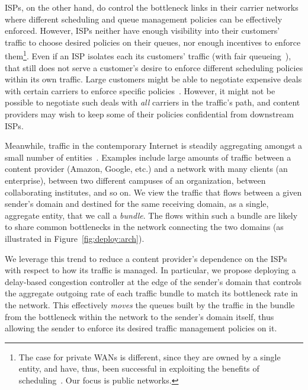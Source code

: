 ISPs, on the other hand, do control the bottleneck links in their carrier networks where different scheduling and queue management policies can be effectively enforced. 
However, ISPs neither have enough visibility into their customers' traffic to choose desired policies on their queues, nor enough incentives to enforce them\footnote{The case for private WANs is different, since they are owned by a single entity, and have, thus, been successful in exploiting the benefits of scheduling~\cite{swan, b4, bwe}. Our focus is public networks.}. Even if an ISP isolates each its customers' traffic (\eg with fair queueing~\cite{fair-queueing}), that still does not serve a customer's desire to enforce different scheduling policies within its own traffic.  
Large customers might be able to negotiate expensive deals with certain carriers to enforce specific policies~\cite{att-qos}. 
However, it might not be possible to negotiate such deals with \emph{all} carriers in the traffic's path, and content providers may wish to keep some of their policies confidential from downstream ISPs. 

\fi




Meanwhile, traffic in the contemporary Internet is steadily aggregating amongst a small number of entities~\cite{fivecomps}. 
Examples include large amounts of traffic between a content provider (\eg Amazon, Google, etc.) and a network with many clients (\eg an enterprise), between two different campuses of an organization, between collaborating institutes, and so on.
We view the traffic that flows between a given sender's domain and destined for the same receiving domain, as a single, aggregate entity, that we call a \emph{bundle}.
The flows within such a bundle are likely to share common bottlenecks in the network connecting the two domains (as illustrated in Figure~\ref{fig:deploy:arch}). %

We leverage this trend to reduce a content provider's dependence on the ISPs with respect to how its traffic is managed. In particular, we propose deploying a delay-based congestion controller at the edge of the sender's domain that controls the aggregate outgoing rate of each traffic bundle to match its bottleneck rate in the network. This effectively \emph{moves} the queues built by the traffic in the bundle from the bottleneck within the network to the sender’s domain itself, thus allowing the sender to enforce its desired traffic management policies on it. 

